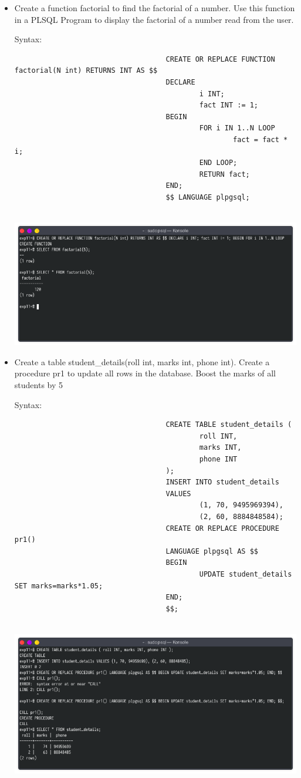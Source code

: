 \documentclass[13pt,oneside]{book}
\begin{document}
									\begin{itemize}
										\item
									Create a function factorial to find the factorial of a number. Use this function in a
									 PL\/SQL Program to display the factorial of a number read from the user.
									 
									Syntax:
									\begin{verbatim}
									CREATE OR REPLACE FUNCTION factorial(N int) RETURNS INT AS $$
									DECLARE
											i INT;
											fact INT := 1;
									BEGIN
											FOR i IN 1..N LOOP
													fact = fact * i;
											END LOOP;
											RETURN fact;
									END;
									$$ LANGUAGE plpgsql;
									
									\end{verbatim}
									\includegraphics[width=\textwidth]{img/p11/ss1.png}
									
									
									\item
									Create a table student\_details(roll int, marks int, phone int). Create a procedure pr1
									 to update all rows in the database. Boost the marks of all students by 5%
									 
									Syntax:
									\begin{verbatim}
									CREATE TABLE student_details (
											roll INT,
											marks INT,
											phone INT
									);
									INSERT INTO student_details 
									VALUES
											(1, 70, 9495969394),
											(2, 60, 8884848584);
									CREATE OR REPLACE PROCEDURE pr1()
									LANGUAGE plpgsql AS $$
									BEGIN
											UPDATE student_details SET marks=marks*1.05;
									END;
									$$;
									
									\end{verbatim}
									\includegraphics[width=\textwidth]{img/p11/ss2.png}
									

\end{itemize}
\end{document}

